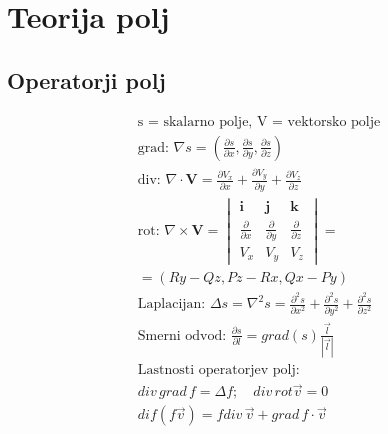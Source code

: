 \documentclass[a4paper,fleqn]{article} %
\begin{document}
\section*{Teorija polj}
\subsection*{Operatorji polj}
\begin{gather*}
    \text{s = skalarno polje, V = vektorsko polje} \\
    \text{grad: } \nabla s = \left(\frac{\partial s}{\partial x}, \frac{\partial s}{\partial y}, \frac{\partial s}{\partial z}\right) \\
    \text{div: } \nabla \cdot \mathbf{V} = \frac{\partial V_x}{\partial x} + \frac{\partial V_y}{\partial y} + \frac{\partial V_z}{\partial z} \\
    \text{rot: } \nabla \times \mathbf{V} =
    \begin{vmatrix}
        \mathbf{i} & \mathbf{j} & \mathbf{k} \\
        \frac{\partial}{\partial x} & \frac{\partial}{\partial y} & \frac{\partial}{\partial z} \\
        V_x & V_y & V_z 
    \end{vmatrix} = \\
    = (Ry-Qz,Pz-Rx,Qx-Py)\\
    \text{Laplacijan: } \Delta s = \nabla^2 s = \frac{\partial^2 s}{\partial x^2} + \frac{\partial^2 s}{\partial y^2} + \frac{\partial^2 s}{\partial z^2} \\
    \text{Smerni odvod: } \frac{\partial s}{\partial l} = grad (s) \frac{\vec{l}}{|\vec{l}|} \\
    \text{Lastnosti operatorjev polj: } \\
    div\, grad\, f = \Delta f; \quad div \, rot \vec{v} = 0 \\ 
    dif(f\vec{v})= f div\, \vec{v}+ grad \,f\cdot \vec{v}
\end{gather*}

\end{document}
